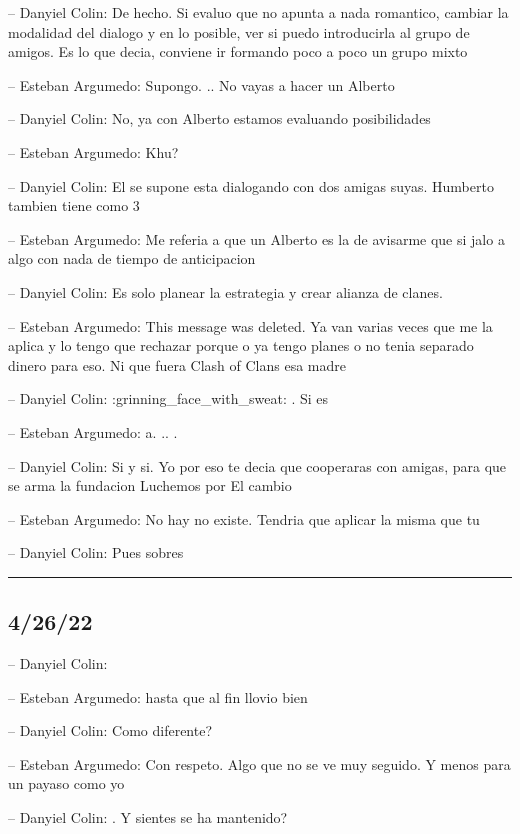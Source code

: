 -- Danyiel Colin: De hecho. Si evaluo que no apunta a nada romantico,
cambiar la modalidad del dialogo y en lo posible, ver si puedo
introducirla al grupo de amigos. Es lo que decia, conviene ir formando
poco a poco un grupo mixto

-- Esteban Argumedo: Supongo. .. No vayas a hacer un Alberto

-- Danyiel Colin: No, ya con Alberto estamos evaluando posibilidades

-- Esteban Argumedo: Khu?

-- Danyiel Colin: El se supone esta dialogando con dos amigas suyas.
Humberto tambien tiene como 3

-- Esteban Argumedo: Me referia a que un Alberto es la de avisarme que
si jalo a algo con nada de tiempo de anticipacion

-- Danyiel Colin: Es solo planear la estrategia y crear alianza de
clanes.

-- Esteban Argumedo: This message was deleted. Ya van varias veces que
me la aplica y lo tengo que rechazar porque o ya tengo planes o no tenia
separado dinero para eso. Ni que fuera Clash of Clans esa madre

-- Danyiel Colin: :grinning\_face\_with\_sweat: . Si es

-- Esteban Argumedo: a. .. .

-- Danyiel Colin: Si y si. Yo por eso te decia que cooperaras con
amigas, para que se arma la fundacion Luchemos por El cambio

-- Esteban Argumedo: No hay no existe. Tendria que aplicar la misma que
tu

-- Danyiel Colin: Pues sobres

\begin{center}\rule{0.5\linewidth}{0.5pt}\end{center}

\hypertarget{section-63}{%
\subsection{4/26/22}\label{section-63}}

-- Danyiel Colin:

-- Esteban Argumedo: hasta que al fin llovio bien

-- Danyiel Colin: Como diferente?

-- Esteban Argumedo: Con respeto. Algo que no se ve muy seguido. Y menos
para un payaso como yo

-- Danyiel Colin: . Y sientes se ha mantenido?

